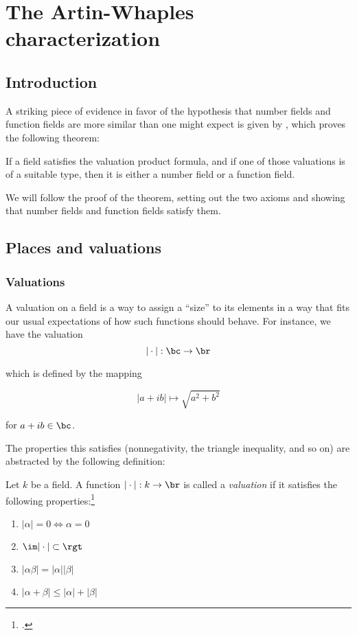\chapter{The Artin-Whaples characterization}
\section{Introduction}
\label{sec:orgheadline1}

A striking piece of evidence in favor of the hypothesis that number fields and
function fields are more similar than one might expect is given by
\cite{artinwhaples}, which proves the following theorem:

\begin{thm}
  \label{thm:maintheorem}
  If a field satisfies the valuation product formula, and if one of those
  valuations is of a suitable type, then it is either a number field or a
  function field.
\end{thm}

We will follow the proof of the theorem, setting out the two axioms and showing
that number fields and function fields satisfy them.

\section{Places and valuations}
\label{sec:orgheadline6}

\subsection{Valuations}
\label{sec:valuations}

A valuation on a field is a way to assign a ``size'' to its elements in a way
that fits our usual expectations of how such functions should behave. For
instance, we have the valuation
\[ |\cdot| : \bc \to \br \]

which is defined by the mapping

\[ |a + ib| \mapsto \sqrt{a^2 + b^2} \]

for $a+ib\in\bc$.

The properties this satisfies (nonnegativity, the triangle inequality, and so
on) are abstracted by the following definition:

\begin{defn}
  Let $k$ be a field. A function $|\cdot|: k\to\br$ is called a
  \textit{valuation} if it satisfies the following properties:\footcite[section
  1]{artinwhaples}
  \begin{enumerate}
  \item $|\alpha| = 0 \iff \alpha = 0$
  \item $\im |\cdot|\subset \rgt$
  \item $|\alpha\beta| = |\alpha||\beta|$
  \item $|\alpha + \beta| \leq |\alpha| + |\beta|$
  \end{enumerate}
\end{defn}

